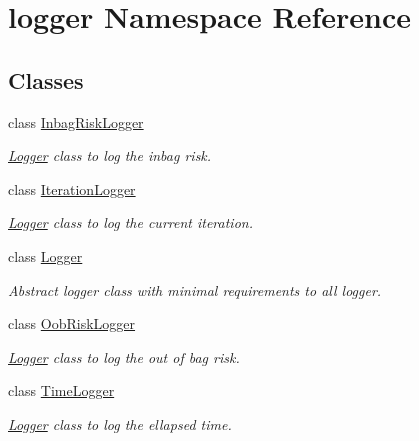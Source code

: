 \hypertarget{namespacelogger}{}\section{logger Namespace Reference}
\label{namespacelogger}
\subsection*{Classes}
\begin{DoxyCompactItemize}
\item 
class \mbox{\hyperlink{classlogger_1_1_inbag_risk_logger}{Inbag\+Risk\+Logger}}
\begin{DoxyCompactList}\small\item\em \mbox{\hyperlink{classlogger_1_1_logger}{Logger}} class to log the inbag risk. \end{DoxyCompactList}\item 
class \mbox{\hyperlink{classlogger_1_1_iteration_logger}{Iteration\+Logger}}
\begin{DoxyCompactList}\small\item\em \mbox{\hyperlink{classlogger_1_1_logger}{Logger}} class to log the current iteration. \end{DoxyCompactList}\item 
class \mbox{\hyperlink{classlogger_1_1_logger}{Logger}}
\begin{DoxyCompactList}\small\item\em Abstract logger class with minimal requirements to all logger. \end{DoxyCompactList}\item 
class \mbox{\hyperlink{classlogger_1_1_oob_risk_logger}{Oob\+Risk\+Logger}}
\begin{DoxyCompactList}\small\item\em \mbox{\hyperlink{classlogger_1_1_logger}{Logger}} class to log the out of bag risk. \end{DoxyCompactList}\item 
class \mbox{\hyperlink{classlogger_1_1_time_logger}{Time\+Logger}}
\begin{DoxyCompactList}\small\item\em \mbox{\hyperlink{classlogger_1_1_logger}{Logger}} class to log the ellapsed time. \end{DoxyCompactList}\end{DoxyCompactItemize}

